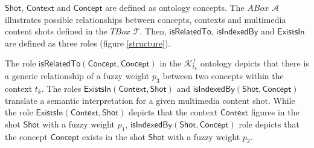 		
		$\mathsf{Shot}$, $\mathsf{Context}$ and $\mathsf{Concept}$ are defined as ontology concepts.  
		The $ABox$ $\mathcal{A}$ illustrates possible relationships 
		between concepts, contexts and multimedia content shots defined in the $TBox$ $\mathcal{T}$. 
		Then, $\mathsf{isRelatedTo}$, $\mathsf{isIndexedBy}$ and $\mathsf{ExistsIn}$ 
		are defined as three roles (figure \ref{structure}).
				
		The role $\mathsf{isRelatedTo(Concept, Concept)}$ in the $\mathcal{K}^{f}_{t_{k}}$ ontology
		depicts that there is a generic relationship of a fuzzy weight $p_{3}$ between two concepts 
		within the context $t_{k}$. 
		The  roles $\mathsf{ExistsIn(Context, Shot)}$ and
		$\mathsf{isIndexedBy(Shot, Concept)}$ translate a 
		semantic interpretation for a given multimedia content shot. While the role 
		$\mathsf{ExistsIn(Context, Shot)}$ depicts that the context 
		$\mathsf{Context}$ figures in the shot $\mathsf{Shot}$ 
		with a fuzzy weight $p_{1}$, $\mathsf{isIndexedBy(Shot, Concept)}$  role
		depicts that the concept $\mathsf{Concept}$ exists in the shot $\mathsf{Shot}$ 
		with a fuzzy weight $p_{2}$.

